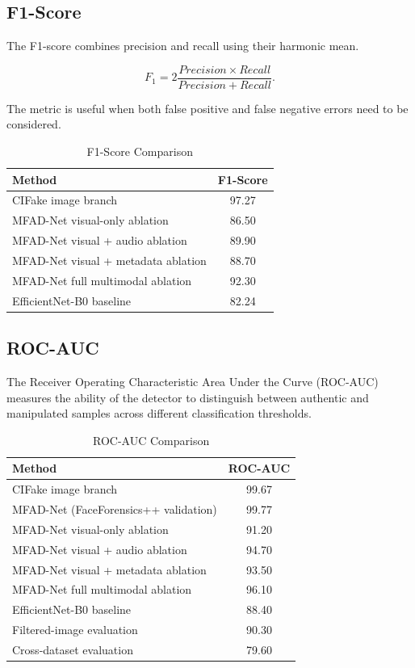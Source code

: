 \documentclass[conference]{IEEEtran}
\begin{document}
\subsection{F1-Score}

The F1-score combines precision and recall using their harmonic mean.

\begin{equation}
F_1 =
2\frac{Precision\times Recall}
{Precision+Recall}.
\end{equation}

The metric is useful when both false positive and false negative errors need to be considered.

\begin{table}[htbp]
\caption{F1-Score Comparison}
\label{tab:f1}
\centering
\begin{tabular}{lc}
\hline
\textbf{Method} & \textbf{F1-Score}\\
\hline
CIFake image branch & 97.27\\
MFAD-Net visual-only ablation & 86.50\\
MFAD-Net visual + audio ablation & 89.90\\
MFAD-Net visual + metadata ablation & 88.70\\
MFAD-Net full multimodal ablation & 92.30\\
EfficientNet-B0 baseline & 82.24\\
\hline
\end{tabular}
\end{table}

\subsection{ROC-AUC}

The Receiver Operating Characteristic Area Under the Curve (ROC-AUC) measures the ability of the detector to distinguish between authentic and manipulated samples across different classification thresholds.

\begin{table}[htbp]
\caption{ROC-AUC Comparison}
\label{tab:auc}
\centering
\begin{tabular}{lc}
\hline
\textbf{Method} & \textbf{ROC-AUC}\\
\hline
CIFake image branch & 99.67\\
MFAD-Net (FaceForensics++ validation) & 99.77\\
MFAD-Net visual-only ablation & 91.20\\
MFAD-Net visual + audio ablation & 94.70\\
MFAD-Net visual + metadata ablation & 93.50\\
MFAD-Net full multimodal ablation & 96.10\\
EfficientNet-B0 baseline & 88.40\\
Filtered-image evaluation & 90.30\\
Cross-dataset evaluation & 79.60\\
\hline
\end{tabular}
\end{table}
\end{document}
